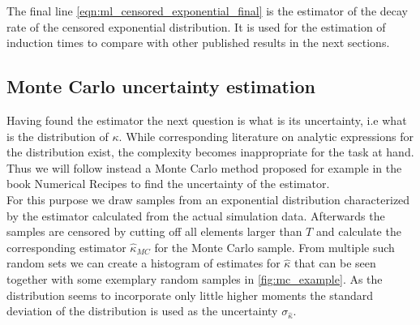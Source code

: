 The final line \autoref{eqn:ml_censored_exponential_final} is the estimator of the decay rate of the censored exponential distribution. It is used for the estimation of induction times to compare with other published results in the next sections.
\subsection{Monte Carlo uncertainty estimation}
\label{sec:mc_uncertainty}
Having found the estimator the next question is what is its uncertainty, i.e what is the distribution of $\kappa$. While corresponding literature on analytic expressions for the distribution exist, the complexity becomes inappropriate for the task at hand. Thus we will follow instead a Monte Carlo method proposed for example in the book Numerical Recipes  to find the uncertainty of the estimator.\\

For this purpose we draw samples from an exponential distribution characterized by the estimator calculated from the actual simulation data. Afterwards the samples are censored by cutting off all elements larger than $T$ and calculate the corresponding estimator $\hat{\kappa}_{MC}$ for the Monte Carlo sample. From multiple such random sets we can create a histogram of estimates for $\hat{\kappa}$ that can be seen together with some exemplary random samples in \autoref{fig:mc_example}. As the distribution seems to incorporate only little higher moments the standard deviation of the distribution is used as the uncertainty $\sigma_{\hat{\kappa}}$.

